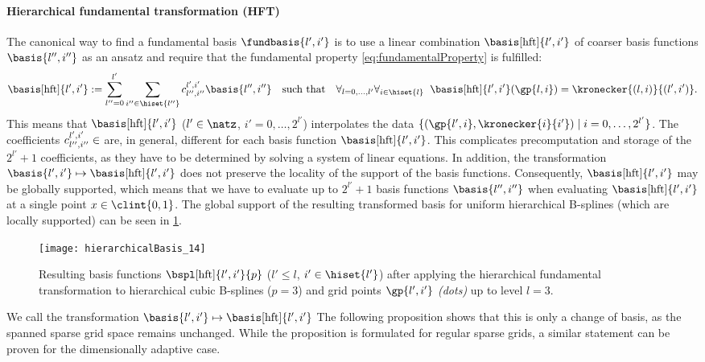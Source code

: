 \paragraph{Hierarchical fundamental transformation (HFT)}

The canonical way to find a fundamental basis $\fundbasis{l',i'}$ is to
use a linear combination $\basis[\hft]{l',i'}$
of coarser basis functions $\basis{l'',i''}$ as an ansatz
and require that the fundamental property \eqref{eq:fundamentalProperty}
is fulfilled:
\begin{equation}
  \label{eq:hierarchicalFundamentalTransformation}
  \basis[\hft]{l',i'}
  := \sum_{l''=0}^{l'} \sum_{i'' \in \hiset{l''}}
  c_{l'',i''}^{l',i'} \basis{l'',i''}
  \quad\text{such that}\quad
  \fafalarge{l = 0, \dotsc, l'}{i \in \hiset{l}}{
    \basis[\hft]{l',i'}(\gp{l,i}) = \kronecker{(l,i)}{(l',i')}.
  }
\end{equation}
This means that
$\basis[\hft]{l',i'}$ ($l' \in \natz$, $i' = 0, \dotsc, 2^{l'}$)
interpolates the data
$\{(\gp{l',i}, \kronecker{i}{i'}) \mid i = 0, \dotsc, 2^{l'}\}$.
The coefficients $c_{l'',i''}^{l',i'} \in \real$
are, in general, different for each basis function $\basis[\hft]{l',i'}$.
This complicates precomputation and storage of the $2^{l'} + 1$ coefficients,
as they have to be determined by solving a system of linear equations.
In addition, the transformation $\basis{l',i'} \mapsto \basis[\hft]{l',i'}$
does not preserve the locality of the support of the basis functions.
Consequently, $\basis[\hft]{l',i'}$ may be globally supported,
which means that we have to evaluate up to $2^{l'} + 1$ basis functions
$\basis{l'',i''}$ when evaluating $\basis[\hft]{l',i'}$ at a single point
$x \in \clint{0, 1}$.
The global support of the resulting transformed basis
for uniform hierarchical B-splines (which are locally supported)
can be seen in \cref{fig:hftBSpline}.

\begin{SCfigure}
  \texttt{[image: hierarchicalBasis\_14]}%
  \caption[%
    Hierarchical fundamental transformation on hierarchical B-splines%
  ]{%
    Resulting basis functions $\bspl[\hft]{l',i'}{p}$
    ($l' \le l$, $i' \in \hiset{l'}$)
    after applying the hierarchical fundamental transformation
    to hierarchical cubic B-splines ($p = 3$) and
    grid points $\gp{l',i'}$ \emph{(dots)} up to level $l = 3$.%
  }%
  \label{fig:hftBSpline}%
\end{SCfigure}

We call the transformation $\basis{l',i'} \mapsto \basis[\hft]{l',i'}$
The following proposition shows that this is only a change of basis,
as the spanned sparse grid space remains unchanged.
While the proposition is formulated for regular sparse grids,
a similar statement can be proven for the dimensionally adaptive case.

